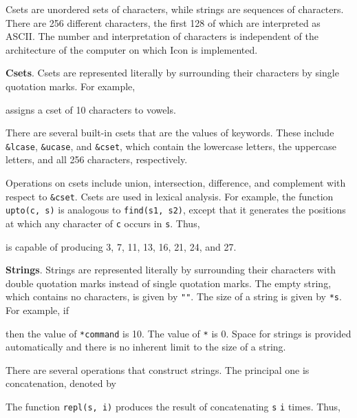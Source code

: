 Csets are unordered sets of characters, while strings are sequences of
characters. There are 256 different characters, the first 128 of which
are interpreted as ASCII. The number and interpretation of characters
is independent of the architecture of the computer on which Icon is
implemented.


\textbf{Csets}. Csets are represented literally by surrounding their
characters by single quotation marks. For example,


\noindent assigns a cset of 10 characters to vowels.

There are several built-in csets that are the values of
keywords. These include \texttt{\&lcase}, \texttt{\&ucase}, and
\texttt{\&cset}, which contain the lowercase letters, the uppercase
letters, and all 256 characters, respectively.

Operations on csets include union, intersection, difference, and
complement with respect to \texttt{\&cset}. Csets are used in lexical
analysis. For example, the function \texttt{upto(c, s)} is analogous
to \texttt{find(s1, s2)}, except that it generates the positions at
which any character of \texttt{c} occurs in \texttt{s}. Thus,


\noindent is capable of producing 3, 7, 11, 13, 16, 21, 24, and 27.


\textbf{Strings}. Strings are represented literally by surrounding
their characters with double quotation marks instead of single
quotation marks. The empty string, which contains no characters, is
given by \texttt{""}. The size of a string
is given by \texttt{*s}. For example, if


\noindent then the value of \texttt{*command} is 10. The value of
\texttt{*{\textquotedbl}{\textquotedbl}} is 0. Space for strings is
provided automatically and there is no inherent limit to the size of a
string.

There are several operations that construct strings. The principal one
is concatenation, denoted by


The function \texttt{repl(s, i)} produces the result of concatenating
\texttt{s} \texttt{i} times. Thus,



